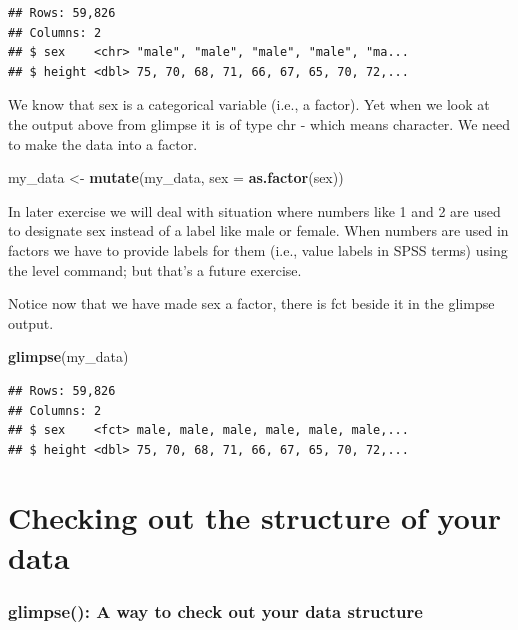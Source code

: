 \documentclass[
]{krantz}
\makeatletter
\newenvironment{Shaded}{\begin{snugshade}}{\end{snugshade}}
\newcommand{\DataTypeTok}[1]{\textcolor[rgb]{0.27,0.27,0.27}{#1}}
\newcommand{\KeywordTok}[1]{\textcolor[rgb]{0.27,0.27,0.27}{\textbf{#1}}}
\newcommand{\NormalTok}[1]{#1}
\newcommand{\StringTok}[1]{\textcolor[rgb]{0.5,0.5,0.5}{#1}}
\newenvironment{kframe}{%
\medskip{}
\setlength{\fboxsep}{.8em}
 \def\at@end@of@kframe{}%
 \ifinner\ifhmode%
  \def\at@end@of@kframe{\end{minipage}}%
  \begin{minipage}{\columnwidth}%
 \fi\fi%
 \def\FrameCommand##1{\hskip\@totalleftmargin \hskip-\fboxsep
 \colorbox{shadecolor}{##1}\hskip-\fboxsep
     \hskip-\linewidth \hskip-\@totalleftmargin \hskip\columnwidth}%
 \MakeFramed {\advance\hsize-\width
   \@totalleftmargin\z@ \linewidth\hsize
   \@setminipage}}%
 {\par\unskip\endMakeFramed%
 \at@end@of@kframe}
\renewenvironment{Shaded}{\begin{kframe}}{\end{kframe}}
\makeatother
\begin{document}
\begin{verbatim}
## Rows: 59,826
## Columns: 2
## $ sex    <chr> "male", "male", "male", "male", "ma...
## $ height <dbl> 75, 70, 68, 71, 66, 67, 65, 70, 72,...
\end{verbatim}

We know that sex is a categorical variable (i.e., a factor). Yet when we look at the output above from glimpse it is of type chr - which means character. We need to make the data into a factor.

\begin{Shaded}
\begin{Highlighting}[]
\NormalTok{my_data <-}\StringTok{ }\KeywordTok{mutate}\NormalTok{(my_data, }\DataTypeTok{sex =} \KeywordTok{as.factor}\NormalTok{(sex))}
\end{Highlighting}
\end{Shaded}

In later exercise we will deal with situation where numbers like 1 and 2 are used to designate sex instead of a label like male or female. When numbers are used in factors we have to provide labels for them (i.e., value labels in SPSS terms) using the level command; but that's a future exercise.

Notice now that we have made sex a factor, there is fct beside it in the glimpse output.

\begin{Shaded}
\begin{Highlighting}[]
\KeywordTok{glimpse}\NormalTok{(my_data)}
\end{Highlighting}
\end{Shaded}

\begin{verbatim}
## Rows: 59,826
## Columns: 2
## $ sex    <fct> male, male, male, male, male, male,...
## $ height <dbl> 75, 70, 68, 71, 66, 67, 65, 70, 72,...
\end{verbatim}

\hypertarget{checking-out-the-structure-of-your-data}{%
\section{Checking out the structure of your data}\label{checking-out-the-structure-of-your-data}}

\hypertarget{glimpse-a-way-to-check-out-your-data-structure}{%
\subsubsection{glimpse(): A way to check out your data structure}\label{glimpse-a-way-to-check-out-your-data-structure}}
\end{document}
